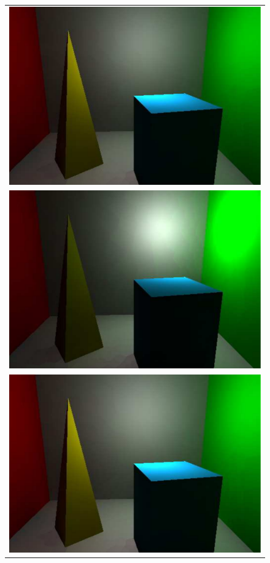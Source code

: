 \begin{figure}
\begin{center}
{\begin{tabular}{c}
\includegraphics*[scale=0.2]{imgs/pq2_ref_frame8.pdf}\\
\includegraphics*[scale=0.2]{imgs/pq2_ref_frame9.pdf}\\
\includegraphics*[scale=0.2]{imgs/pq2_ref_frame10.pdf}

\end{tabular}}
\end{center}
\end{figure}
